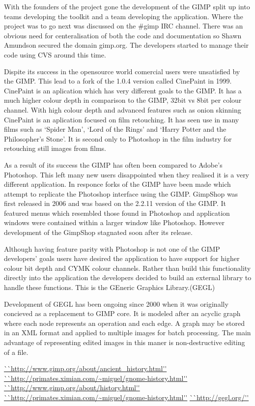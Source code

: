 \documentclass[a4 paper, 12pt]{article}
\begin{document}
	With the founders of the project gone the development of the GIMP split up
	into teams developing the toolkit and a team developing the application.
	Where the project was to go next was discussed on  the \#gimp IRC channel.
	There was an obvious need for centeralisation of both the code and
	documentation so Shawn Amundson secured the domain gimp.org. The developers
	started to manage their code using CVS around this time.

	Dispite its success in the opensource world comercial users were unsatisfied
	by the GIMP. This lead to a fork of the 1.0.4 version called CinePaint in
	1999.\cite{release} CinePaint is an aplication which has very different
	goals to the GIMP. It has a much higher colour depth in comparison to the
	GIMP, 32bit vs 8bit per colour channel. With high colour depth and advanced
	features such as onion skinning CinePaint is an aplication focused on film
	retouching. It has seen use in many films such as `Spider Man', `Lord of the
	Rings' and `Harry Potter and the Philosopher's Stone'. It is second only to
	Photoshop in the film industry for retouching still images from films.
	
	As a result of its success the GIMP has often been compared to Adobe's
	Photoshop. This left many new users disappointed when they realised it is a
	very different application. In responce forks of the GIMP have been made
	which attempt to replicate the Photoshop interface using the GIMP. GimpShop
	was first released in 2006 and was based on the 2.2.11 version of the GIMP.
	It featured menus which resembled those found in Photoshop and application
	windows were contained within a larger window like Photoshop. However
	development of the GimpShop stagnated soon after its release.

	Although having feature parity with Photoshop is not one of the GIMP
	developers' goals users have desired the application to have support for
	higher colour bit depth and CYMK colour channels. Rather than build this
	functionality directly into the application the developers decided to build
	an external library to handle these functions. This is the GEneric Graphics
	Library.(GEGL)

	Development of GEGL has been ongoing since 2000 when it was originally
	concieved as a replacement to GIMP core. It is modeled after an acyclic
	graph where each node represents an operation and each edge. A graph may be
	stored in an XML format and applied to multiple images for batch
	processing. The main advantage of representing edited images in this maner
	is non-destructive editing of a file.
	
\begin{thebibliography}{12}
		\url{``http://www.gimp.org/about/ancient_history.html''}
		\url{``http://primates.ximian.com/~miguel/gnome-history.html''}
		\url{``http://www.gimp.org/about/history.html''}
		\url{``http://primates.ximian.com/~miguel/gnome-history.html''}
		\url{``http://gegl.org/''}
\end{thebibliography}
\end{document}
